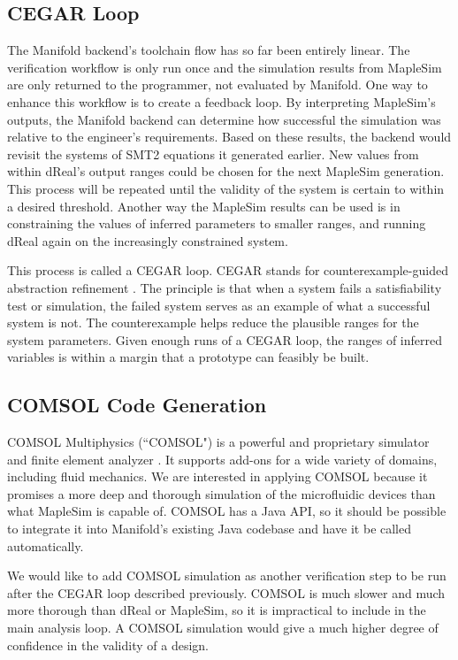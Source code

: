 \subsection{CEGAR Loop}

The Manifold backend's toolchain flow has so far been entirely linear.
The verification workflow is only run once and the simulation results from MapleSim are only returned
to the programmer, not evaluated by Manifold. One way to enhance this workflow is to create a feedback
loop.
By interpreting MapleSim's outputs, the Manifold backend can determine how successful the simulation was
relative to the engineer's requirements.
Based on these results, the backend would revisit the systems of SMT2 equations it generated earlier.
New values from within dReal's output ranges could be chosen for the next MapleSim generation.
This process will be repeated until the validity of the system is certain to within a desired threshold.
Another way the MapleSim results can be used is in constraining the values of inferred parameters to
smaller ranges, and running dReal again on the increasingly constrained system.

This process is called a CEGAR loop. CEGAR stands for counterexample-guided abstraction refinement \cite
{cegar}.
The principle is that when a system fails a satisfiability test or simulation, the failed system
serves as an example of what a successful system is not.
The counterexample helps reduce the plausible ranges for the system parameters.
Given enough runs of a CEGAR loop, the ranges of inferred variables is within a margin that a prototype
can feasibly be built.

\subsection{COMSOL Code Generation}

COMSOL Multiphysics (``COMSOL") \cite{comsol} is a powerful and proprietary simulator and finite element analyzer \cite{fem}.
It supports add-ons for a wide variety of domains, including fluid mechanics.
We are interested in applying COMSOL because it promises a more deep and thorough simulation of the microfluidic devices than what MapleSim is capable of.
COMSOL has a Java API, so it should be possible to integrate it into Manifold's existing Java codebase and have it be called automatically.

We would like to add COMSOL simulation as another verification step to be run after the CEGAR
loop described previously.
COMSOL is much slower and much more thorough than dReal or MapleSim, so it is impractical to include
in the main analysis loop. A COMSOL simulation would give a much higher degree of confidence in the
validity of a design.